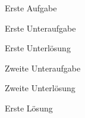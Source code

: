 \documentclass[a4paper]{article}
\begin{document}
\begin{exercise}
    Erste Aufgabe

    \begin{subexercise}
        Erste Unteraufgabe
    \end{subexercise}
    \begin{subsolution}
        Erste Unterlösung
    \end{subsolution}

    \begin{subexercise}
        Zweite Unteraufgabe
    \end{subexercise}
    \begin{subsolution}
        Zweite Unterlösung
    \end{subsolution}

\end{exercise}
\begin{solution}
    Erste Lösung
\end{solution}
\end{document}

